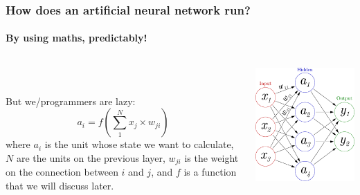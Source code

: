 \documentclass{beamer}
\begin{document}
\begin{frame}
\frametitle{How does an artificial neural network run?}
\framesubtitle{By using maths, predictably!}
  \begin{columns}[T]
    \begin{column}{.5\textwidth}
     \ \\
     \ \\
     
But we/programmers are lazy:
\begin{equation*}
a_i = f \left( \sum_1^N x_j \times w_{ji} \right)
\end{equation*}
where $a_i$ is the unit whose state we want to calculate, $N$ are the units on the previous layer, $w_{ji}$ is the weight on the connection between $i$ and $j$, and $f$ is a function that we will discuss later.

    \end{column}
    \begin{column}{.5\textwidth}


	\includegraphics[width=\linewidth]{./fig/3-layer_maths.pdf}
    \end{column}
  \end{columns}
\end{frame}
\end{document}
